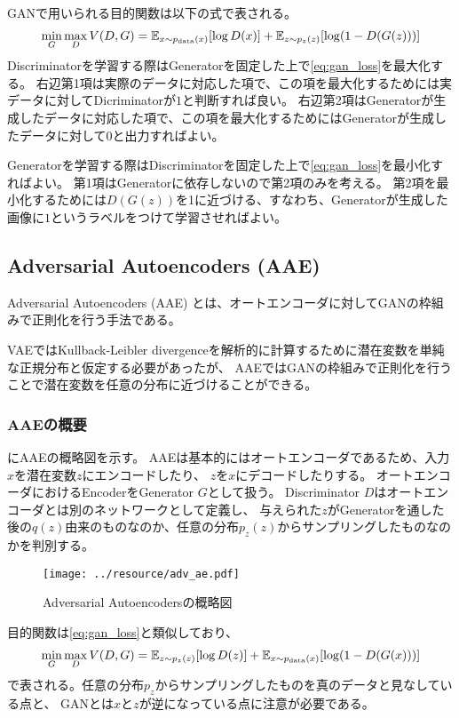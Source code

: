 GANで用いられる目的関数は以下の式で表される。
\begin{align}
    \min_{G}\max_{D}V(D, G) = \operatorname{\mathbb{E}}_{x\sim p_{\mathrm{data}}(x)}[\log D(x)] + \operatorname{\mathbb{E}}_{z\sim p_{z}(z)}[\log(1-D(G(z)))] \label{eq:gan_loss}
\end{align}
Discriminatorを学習する際はGeneratorを固定した上で\eqref{eq:gan_loss}を最大化する。
右辺第1項は実際のデータに対応した項で、この項を最大化するためには実データに対してDicriminatorが$1$と判断すれば良い。
右辺第2項はGeneratorが生成したデータに対応した項で、この項を最大化するためにはGeneratorが生成したデータに対して$0$と出力すればよい。

Generatorを学習する際はDiscriminatorを固定した上で\eqref{eq:gan_loss}を最小化すればよい。
第1項はGeneratorに依存しないので第2項のみを考える。
第2項を最小化するためには$D(G(z))$を1に近づける、すなわち、Generatorが生成した画像に$1$というラベルをつけて学習させればよい。

\subsection{Adversarial Autoencoders (AAE)} \label{aae}

Adversarial Autoencoders (AAE) \cite{aae}とは、オートエンコーダに対してGANの枠組みで正則化を行う手法である。

VAEではKullback-Leibler divergenceを解析的に計算するために潜在変数を単純な正規分布と仮定する必要があったが、
AAEではGANの枠組みで正則化を行うことで潜在変数を任意の分布に近づけることができる。

\subsubsection{AAEの概要}

にAAEの概略図を示す。
AAEは基本的にはオートエンコーダであるため、入力$x$を潜在変数$z$にエンコードしたり、
$z$を$x$にデコードしたりする。
オートエンコーダにおけるEncoderをGenerator $G$として扱う。
Discriminator $D$はオートエンコーダとは別のネットワークとして定義し、
与えられた$z$がGeneratorを通した後の$q(z)$由来のものなのか、任意の分布$p_z(z)$からサンプリングしたものなのかを判別する。
\begin{figure}[tbp]
    \centering
    \texttt{[image: ../resource/adv\_ae.pdf]}
    \caption{Adversarial Autoencodersの概略図\cite{aae}} \label{fig:adv_ae}
\end{figure}

目的関数は\eqref{eq:gan_loss}と類似しており、
\begin{align}
    \min_{G}\max_{D}V(D, G) = \operatorname{\mathbb{E}}_{z\sim p_z(z)}[\log D(z)] + \operatorname{\mathbb{E}}_{x\sim p_{\mathrm{data}}(x)}[\log(1-D(G(x)))] \label{eq:aae_loss}
\end{align}
で表される。任意の分布$p_z$からサンプリングしたものを真のデータと見なしている点と、
GANとは$x$と$z$が逆になっている点に注意が必要である。

